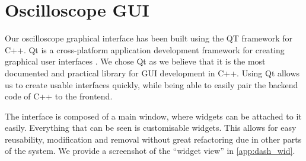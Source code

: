 \section{Oscilloscope GUI}
    Our oscilloscope graphical interface has been built using the QT framework for C++. Qt is a cross-platform application development framework for creating graphical user interfaces \cite{qt-w}. We chose Qt as we believe that it is the most documented and practical library for GUI development in C++. Using Qt allows us to create usable interfaces quickly, while being able to easily pair the backend code of C++ to the frontend.

    The interface is composed of a main window, where widgets can be attached to it easily. Everything that can be seen is customisable widgets. This allows for easy reusability, modification and removal without great refactoring due in other parts of the system. We provide a screenshot of the ``widget view'' in \cref{app:dash_wid}.

